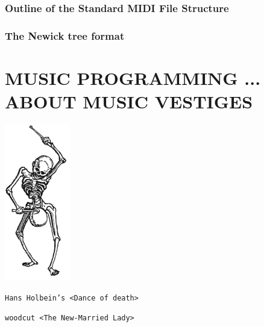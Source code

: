 \documentclass{book}
\begin{document}
\section{Outline of the Standard MIDI File Structure}
\label{infomidi}


\newpage
\section{The Newick tree format}
\label{nwdoc}


\part[Music Programming ... about music vestiges]{MUSIC PROGRAMMING ... ABOUT MUSIC VESTIGES}

\thispagestyle{empty}



\thispagestyle{empty}





\begin{titlepage} 
\clearpage
\ifodd\thepage\hbox{}\newpage\else\fi%
\thispagestyle{empty}

\pagecolor{aureolin!30}

\vspace*{\baselineskip} 	
	
	\vspace*{0.167\textheight} 
	
\centerline{\includegraphics[scale=0.8]{img/logo}}
\vspace{.5cm}
  
\centerline{  {\tiny  \texttt{Hans Holbein's <Dance of death>} }}
\vspace{-0.2cm} 
\centerline{  {\tiny  \texttt{woodcut <The New-Married Lady>} }}

\end{titlepage}
\end{document}
